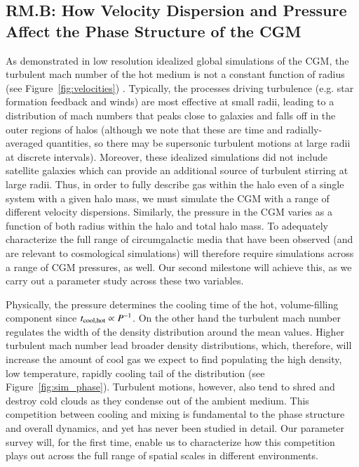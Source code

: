 \documentclass[11pt,letterpaper,english]{article}
\begin{document}
\vspace{-.25in}
\subsection{RM.B: How Velocity Dispersion and Pressure Affect the Phase Structure of the CGM}
\vspace{-.2in}



As demonstrated in low resolution idealized global simulations of the CGM, the turbulent mach number of the hot medium is not a constant function of radius (see Figure~\ref{fig:velocities}) \cite{Fielding17}. Typically, the processes driving turbulence (e.g. star formation feedback and winds) are most effective at small radii, leading to a distribution of mach numbers that peaks close to galaxies and falls off in the outer regions of halos (although we note that these are time and radially-averaged quantities, so there may be supersonic turbulent motions at large radii at discrete intervals). Moreover, these idealized simulations did not include satellite galaxies which can provide an additional source of turbulent stirring at large radii. Thus, in order to fully describe gas within the halo even of a single system with a given halo mass, we must simulate the CGM with a range of different velocity dispersions. Similarly, the pressure in the CGM varies as a function of both radius within the halo and total halo mass. To adequately characterize the full range of circumgalactic media that have been observed (and are relevant to cosmological simulations) will therefore require simulations across a range of CGM pressures, as well. Our second milestone will achieve this, as we carry out a parameter study across these two variables.


Physically, the pressure determines the cooling time of the hot, volume-filling component since $t_{\rm cool, hot} \propto P^{-1}$. On the other hand the turbulent mach number regulates the width of the density distribution around the mean values. Higher turbulent mach number lead broader density distributions, which, therefore, will increase the amount of cool gas we expect to find populating the high density, low temperature, rapidly cooling tail of the distribution (see Figure~\ref{fig:sim_phase}). Turbulent motions, however, also tend to shred and destroy cold clouds as they condense out of the ambient medium. This competition between cooling and mixing is fundamental to the phase structure and overall dynamics, and yet has never been studied in detail. Our parameter survey will, for the first time, enable us to characterize how this competition plays out across the full range of spatial scales in different environments.
\end{document}

